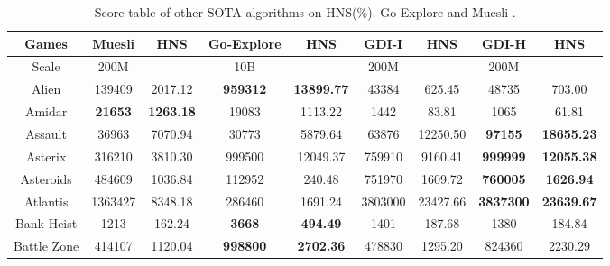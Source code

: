 \documentclass[nohyperref]{article}
\theoremstyle{plain}
\begin{document}
\begin{table}[!hb]
\footnotesize
\begin{center}
\caption{Score table of other SOTA algorithms on HNS(\%). Go-Explore \citep{goexplore} and Muesli \citep{muesli}.}
\label{Tab:Score table of other SOTA algorithms on HNS.}
\setlength{\tabcolsep}{1.0pt}
\begin{tabular}{|c |c c| c c| c c |c c|}            
\hline
 Games        & Muesli & HNS      & Go-Explore              & HNS                     & GDI-I & HNS               & GDI-H & HNS \\
\hline
Scale         &  200M   &            & 10B                     &                             & 200M              &                &  200M   &\\
\hline
 Alien        &139409          &2017.12                   &\textbf{959312}       &\textbf{13899.77}              & 43384             &625.45            &48735	             &703.00              \\
 Amidar       &\textbf{21653}  &\textbf{1263.18}          &19083                 &1113.22                        & 1442              &83.81             &1065              &61.81           \\
 Assault      &36963           &7070.94                   &30773                 &5879.64                        & 63876      &12250.50   &\textbf{97155	}    &\textbf{18655.23}       \\
 Asterix      &316210          &3810.30                   &999500       &12049.37              & 759910            &9160.41           &\textbf{999999}    &\textbf{12055.38}\\
 Asteroids    &484609          &1036.84                   &112952                &240.48                         & 751970     &1609.72    &\textbf{760005}            &\textbf{1626.94}       \\
 Atlantis     &1363427         &8348.18                   &286460                &1691.24                        & 3803000    &23427.66   &\textbf{3837300}           &\textbf{23639.67}       \\
 Bank Heist   &1213            &162.24                    &\textbf{3668}         &\textbf{494.49}                & 1401              &187.68            &1380              &184.84\\
 Battle Zone  &414107          &1120.04                   &\textbf{998800}       &\textbf{2702.36}               & 478830            &1295.20           &824360            &2230.29\\

\end{tabular}
\end{center}
\end{table}
\end{document}
